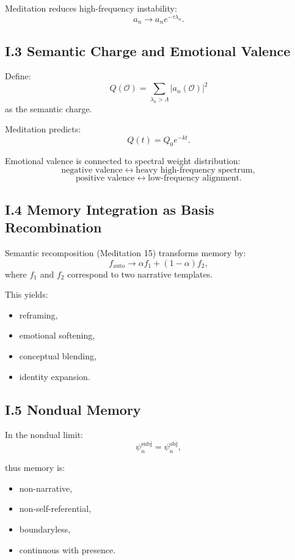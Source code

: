 \documentclass[12pt]{article}
\begin{document}
Meditation reduces high-frequency instability:
\[
a_n \to a_n e^{-\tau \lambda_n}.
\]

\subsection*{I.3 Semantic Charge and Emotional Valence}

Define:
\[
Q(\mathcal{O})
=
\sum_{\lambda_n > \Lambda}
    |a_n(\mathcal{O})|^2
\]
as the semantic charge.

Meditation predicts:
\[
Q(t) = Q_0 e^{-k t}.
\]

Emotional valence is connected to spectral weight distribution:
\[
\text{negative valence}
\leftrightarrow
\text{heavy high-frequency spectrum},
\]
\[
\text{positive valence}
\leftrightarrow
\text{low-frequency alignment}.
\]

\subsection*{I.4 Memory Integration as Basis Recombination}

Semantic recomposition (Meditation 15) transforms memory by:
\[
f_{\text{auto}} \to
\alpha f_{1} + (1-\alpha) f_{2},
\]
where $f_1$ and $f_2$ correspond to two narrative templates.

This yields:
\begin{itemize}
\item reframing,
\item emotional softening,
\item conceptual blending,
\item identity expansion.
\end{itemize}

\subsection*{I.5 Nondual Memory}

In the nondual limit:
\[
\psi_n^{\text{subj}} = \psi_n^{\text{obj}},
\]

thus memory is:
\begin{itemize}
\item non-narrative,
\item non-self-referential,
\item boundaryless,
\item continuous with presence.
\end{itemize}
\end{document}
